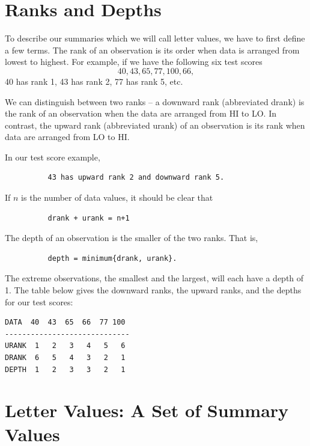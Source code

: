 \documentclass[
]{book}
\begin{document}
\hypertarget{ranks-and-depths}{%
\section{Ranks and Depths}\label{ranks-and-depths}}

To describe our summaries which we will call letter values, we have to first define a few terms. The rank of an observation is its order when data is arranged from lowest to highest. For example, if we have the following six test scores
\[
40, 43, 65, 77, 100, 66,
\]
40 has rank 1, 43 has rank 2, 77 has rank 5, etc.

We can distinguish between two ranks -- a downward rank (abbreviated drank) is the rank of an observation when the data are arranged from HI to LO. In contrast, the upward rank (abbreviated urank) of an observation is its rank when data are arranged from LO to HI.

In our test score example,

\begin{verbatim}
          43 has upward rank 2 and downward rank 5.
\end{verbatim}

If \(n\) is the number of data values, it should be clear that

\begin{verbatim}
          drank + urank = n+1
\end{verbatim}

The depth of an observation is the smaller of the two ranks. That is,

\begin{verbatim}
          depth = minimum{drank, urank}.
\end{verbatim}

The extreme observations, the smallest and the largest, will each have a depth of 1. The table below gives the downward ranks, the upward ranks, and the depths for our test scores:

\begin{verbatim}
DATA  40  43  65  66  77 100
-----------------------------
URANK  1   2   3   4   5   6
DRANK  6   5   4   3   2   1
DEPTH  1   2   3   3   2   1
\end{verbatim}

\hypertarget{letter-values-a-set-of-summary-values}{%
\section{Letter Values: A Set of Summary Values}\label{letter-values-a-set-of-summary-values}}
\end{document}
